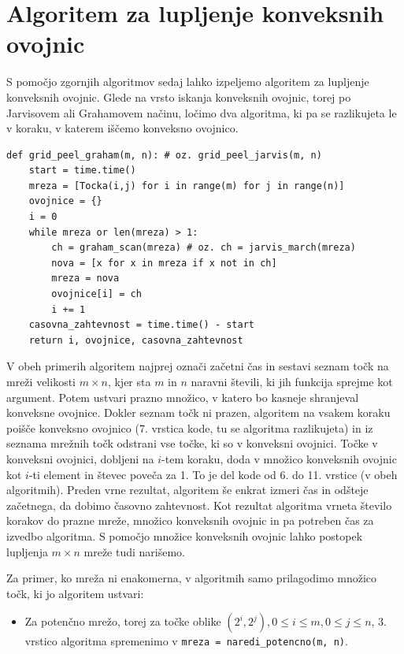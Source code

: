 \documentclass[a4paper]{article}
\begin{document}
\section{Algoritem za lupljenje konveksnih ovojnic}
S pomočjo zgornjih algoritmov sedaj lahko izpeljemo algoritem za lupljenje konveksnih ovojnic. Glede na vrsto iskanja konveksnih ovojnic, torej po Jarvisovem ali 
Grahamovem načinu, ločimo dva algoritma, ki pa se razlikujeta le v koraku, v katerem iščemo konveksno ovojnico.

\begin{lstlisting}
def grid_peel_graham(m, n): # oz. grid_peel_jarvis(m, n)
    start = time.time()
    mreza = [Tocka(i,j) for i in range(m) for j in range(n)]
    ovojnice = {}
    i = 0
    while mreza or len(mreza) > 1:
        ch = graham_scan(mreza) # oz. ch = jarvis_march(mreza)
        nova = [x for x in mreza if x not in ch]
        mreza = nova
        ovojnice[i] = ch
        i += 1
    casovna_zahtevnost = time.time() - start 
    return i, ovojnice, casovna_zahtevnost
\end{lstlisting}

V obeh primerih algoritem najprej označi začetni čas in sestavi seznam točk na mreži velikosti $m \times n$, kjer sta $m$ in $n$ naravni števili, ki jih funkcija sprejme kot argument. Potem ustvari 
prazno množico, v katero bo kasneje shranjeval konveksne ovojnice. Dokler seznam točk ni prazen, algoritem na vsakem koraku poišče konveksno ovojnico (7. vrstica kode, tu se algoritma razlikujeta) 
in iz seznama mrežnih točk odstrani vse točke, ki so v konveksni ovojnici. Točke v konveksni ovojnici, dobljeni na $i$-tem koraku, doda v množico konveksnih ovojnic kot $i$-ti element in števec 
poveča za 1. To je del kode od 6. do 11. vrstice (v obeh algoritmih). Preden vrne rezultat, algoritem še enkrat izmeri čas in odšteje začetnega, da dobimo časovno zahtevnost. Kot rezultat algoritma 
vrneta število korakov do prazne mreže, množico konveksnih ovojnic in pa potreben čas za izvedbo algoritma. S pomočjo množice konveksnih ovojnic lahko postopek lupljenja $m \times n$ mreže tudi narišemo.

Za primer, ko mreža ni enakomerna, v algoritmih samo prilagodimo množico točk, ki jo algoritem ustvari:

\begin{itemize}
    \item {Za potenčno mrežo, torej za točke oblike $(2^i, 2^j), 0 \leq i \leq m, 0 \leq j \leq n$, 3. vrstico algoritma spremenimo v \lstinline{mreza = naredi_potencno(m, n)}.}
\end{itemize}
\end{document}
